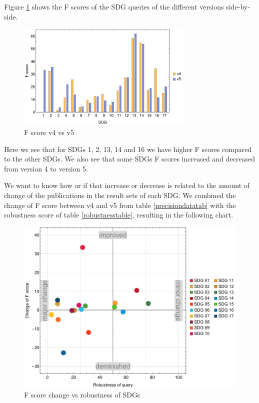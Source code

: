 \documentclass{article}
\begin{document}
Figure \ref{f1barchart} shows the F scores of the SDG queries of the different versions side-by-side. 
\begin{figure}[H]
	\centering
  \includegraphics[width=0.75\textwidth]{figures/f1barchart.pdf}
	\caption{F score v4 vs v5}
	\label{f1barchart}
\end{figure}

Here we see that for SDGs 1, 2, 13, 14 and 16 we have higher F scores compared to the other SDGs. We also see that some SDGs F scores increased and decreased from version 4 to version 5.

We want to know how or if that increase or decrease is related to the amount of change of the publications in the result sets of each SDG. We combined the change of F score between v4 and v5 from table \ref{precisiondatatab} with the robustness score of table \ref{robustnesstable}, resulting in the following chart. 

\begin{figure}[H]
	\centering
  \includegraphics[width=\textwidth]{figures/scatterplot1-fscore-robustness.pdf}
	\caption{F score change vs robustness of SDGs}
	\label{fscore-vs-robustnes}
\end{figure}
\end{document}
